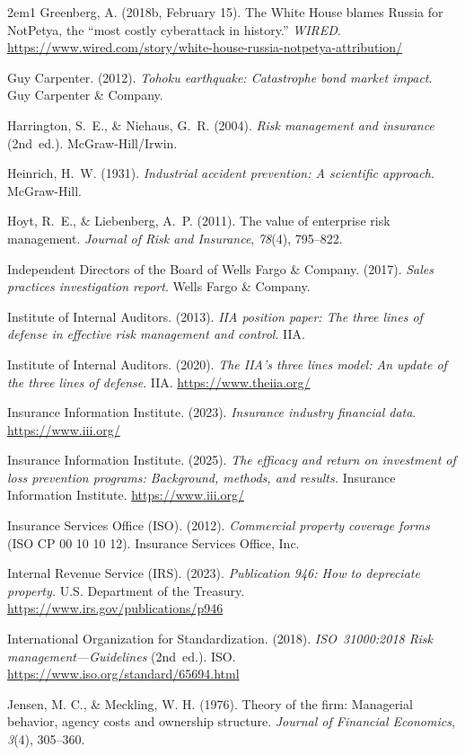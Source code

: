 \begin{hangparas}{2em}{1}
Greenberg, A. (2018b, February 15). The White House blames Russia for
NotPetya, the ``most costly cyberattack in history.'' \emph{WIRED}.
\url{https://www.wired.com/story/white-house-russia-notpetya-attribution/}

Guy Carpenter. (2012). \emph{Tohoku earthquake: Catastrophe bond market
impact}. Guy Carpenter \& Company.

Harrington, S.~E., \& Niehaus, G.~R. (2004). \emph{Risk management and
insurance} (2nd~ed.). McGraw-Hill/Irwin.

Heinrich, H.~W. (1931). \emph{Industrial accident prevention: A scientific
approach.} McGraw-Hill.

Hoyt, R.~E., \& Liebenberg, A.~P. (2011). The value of enterprise risk
management. \emph{Journal of Risk and Insurance}, \emph{78}(4), 795--822.

Independent Directors of the Board of Wells Fargo \& Company. (2017).
\emph{Sales practices investigation report}. Wells Fargo \& Company.

Institute of Internal Auditors. (2013). \emph{IIA position paper: The three
lines of defense in effective risk management and control}. IIA.

Institute of Internal Auditors. (2020). \emph{The IIA's three lines model: An
update of the three lines of defense}. IIA. \url{https://www.theiia.org/}

Insurance Information Institute. (2023). \emph{Insurance industry financial
data}. \url{https://www.iii.org/}

Insurance Information Institute. (2025). \emph{The efficacy and return on
investment of loss prevention programs: Background, methods, and results.}
Insurance Information Institute. \url{https://www.iii.org/}

Insurance Services Office (ISO). (2012). \emph{Commercial property coverage
forms} (ISO CP 00 10 10 12). Insurance Services Office, Inc.

Internal Revenue Service (IRS). (2023). \emph{Publication 946: How to
depreciate property.} U.S. Department of the Treasury.
\url{https://www.irs.gov/publications/p946}

International Organization for Standardization. (2018). \emph{ISO~31000:2018
Risk management---Guidelines} (2nd~ed.). ISO.
\url{https://www.iso.org/standard/65694.html}

Jensen, M. C., \& Meckling, W. H. (1976). Theory of the firm: Managerial
behavior, agency costs and ownership structure. \emph{Journal of Financial
Economics}, \emph{3}(4), 305--360.


\end{hangparas}
